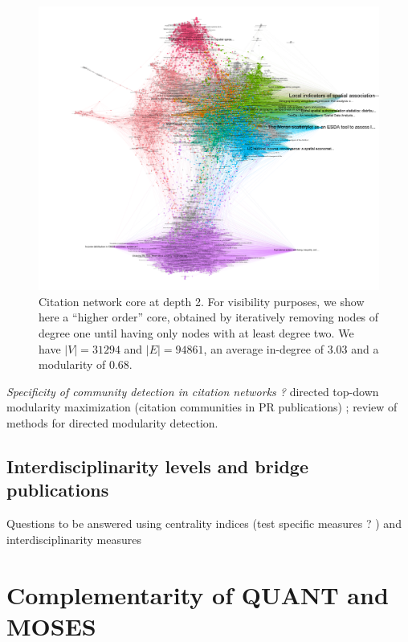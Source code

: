 \documentclass[11pt]{article}
\begin{document}
\begin{figure}
  \includegraphics[width=\linewidth]{figures/microsim_depth2_corehigher.png}
  \caption{Citation network core at depth 2. For visibility purposes, we show here a ``higher order'' core, obtained by iteratively removing nodes of degree one until having only nodes with at least degree two. We have $\left|V\right|=31294$ and $\left|E\right|=94861$, an average in-degree of 3.03 and a modularity of 0.68.}
  \label{fig:citnwdepth2}
\end{figure}


\textit{Specificity of community detection in citation networks ? } \cite{chen2010community} directed top-down modularity maximization (citation communities in PR publications) ; \cite{malliaros2013clustering} review of methods for directed modularity detection.

\subsection{Interdisciplinarity levels and bridge publications}

Questions to be answered using centrality indices (test specific measures ? \cite{latora2007measure}) and interdisciplinarity measures \cite{leydesdorff2011indicators}


\section{Complementarity of QUANT and MOSES}
\end{document}
